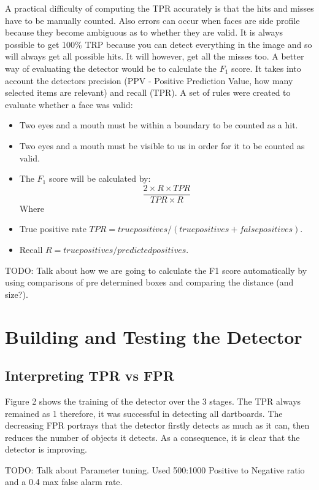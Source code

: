 \documentclass[a4paper]{article}
\begin{document}
A practical difficulty of computing the TPR accurately is that the hits and
misses have to be manually counted. Also errors can occur when faces are side
profile because they become ambiguous as to whether they are valid. It is
always possible to get 100\% TRP because you can detect everything in the image
and so will always get all possible hits. It will however, get all the misses
too. A better way of evaluating the detector would be to calculate the
\(F_{1}\) score. It takes into account the detectors precision (PPV - Positive
Prediction Value, how many selected items are relevant) and recall (TPR). A set
of rules were created to evaluate whether a face was valid:


\begin{itemize}
  \item Two eyes and a mouth must be within a boundary to be counted as a hit.
  \item Two eyes and a mouth must be visible to us in order for it to be
    counted as valid.
  \item The \(F_{1}\) score will be calculated by: \[\frac{2 \times R \times
    TPR}{TPR \times R}\] Where
  \item True positive rate ${TPR = true positives / (true positives + false
    positives)}$.
  \item Recall ${R = true positives / predicted positives}$.
\end{itemize}

TODO: Talk about how we are going to calculate the F1 score automatically by
using comparisons of pre determined boxes and comparing the distance (and
size?).

\section*{Building and Testing the Detector}
\subsection*{Interpreting TPR vs FPR}
\vspace{-0.7em}

Figure 2 shows the training of the detector over the 3 stages. The TPR always
remained as 1 therefore, it was successful in detecting all dartboards. The
decreasing FPR portrays that the detector firstly detects as much as it can,
then reduces the number of objects it detects. As a consequence, it is clear
that the detector is improving.

TODO: Talk about Parameter tuning.  Used 500:1000 Positive to Negative ratio
and a 0.4 max false alarm rate.
\end{document}
